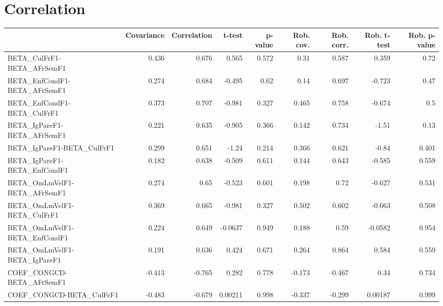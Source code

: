 \section{Correlation}
\begin{tabular}{lrrrrrrrr}
\toprule
{} &  Covariance &  Correlation &  t-test &  p-value &  Rob. cov. &  Rob. corr. &  Rob. t-test &  Rob. p-value \\
\midrule
BETA\_CulFrF1-BETA\_AFrSemF1            &       0.436 &        0.676 &   0.565 &    0.572 &       0.31 &       0.587 &        0.359 &          0.72 \\
BETA\_EnfCondF1-BETA\_AFrSemF1          &       0.274 &        0.684 &  -0.495 &     0.62 &       0.14 &       0.697 &       -0.723 &          0.47 \\
BETA\_EnfCondF1-BETA\_CulFrF1           &       0.373 &        0.707 &  -0.981 &    0.327 &      0.465 &       0.758 &       -0.674 &           0.5 \\
BETA\_IgPareF1-BETA\_AFrSemF1           &       0.221 &        0.635 &  -0.905 &    0.366 &      0.142 &       0.734 &        -1.51 &          0.13 \\
BETA\_IgPareF1-BETA\_CulFrF1            &       0.299 &        0.651 &   -1.24 &    0.214 &      0.366 &       0.621 &        -0.84 &         0.401 \\
BETA\_IgPareF1-BETA\_EnfCondF1          &       0.182 &        0.638 &  -0.509 &    0.611 &      0.144 &       0.643 &       -0.585 &         0.559 \\
BETA\_OmLmVelF1-BETA\_AFrSemF1          &       0.274 &         0.65 &  -0.523 &    0.601 &      0.198 &        0.72 &       -0.627 &         0.531 \\
BETA\_OmLmVelF1-BETA\_CulFrF1           &       0.369 &        0.665 &  -0.981 &    0.327 &      0.502 &       0.602 &       -0.663 &         0.508 \\
BETA\_OmLmVelF1-BETA\_EnfCondF1         &       0.224 &        0.649 & -0.0637 &    0.949 &      0.188 &        0.59 &      -0.0582 &         0.954 \\
BETA\_OmLmVelF1-BETA\_IgPareF1          &       0.191 &        0.636 &   0.424 &    0.671 &      0.264 &       0.864 &        0.584 &         0.559 \\
COEF\_CONGCD-BETA\_AFrSemF1             &      -0.413 &       -0.765 &   0.282 &    0.778 &     -0.173 &      -0.467 &         0.34 &         0.734 \\
COEF\_CONGCD-BETA\_CulFrF1              &      -0.483 &       -0.679 & 0.00211 &    0.998 &     -0.337 &      -0.299 &      0.00187 &         0.999 \\

\end{tabular}
